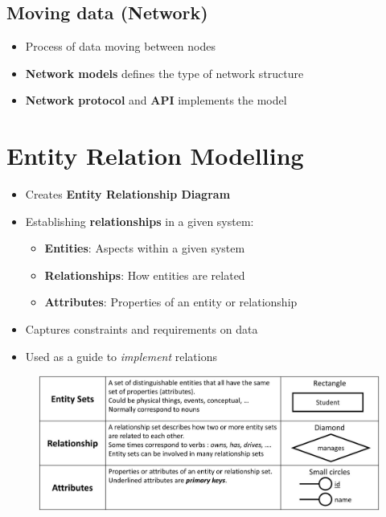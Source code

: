 \documentclass[conference]{IEEEtran}
\begin{document}
\subsection{Moving data (Network)}

\begin{itemize}
    \item Process of data moving between nodes
    \item \textbf{Network models} defines the type of network structure
    \item \textbf{Network protocol} and \textbf{API} implements the model
\end{itemize}

\section{\textbf{Entity Relation Modelling}}
\begin{itemize}
    \item Creates \textbf{Entity Relationship Diagram}
    \item Establishing \textbf{relationships} in a given system:
    \begin{itemize}
        \item \textbf{Entities}: Aspects within a given system
        \item \textbf{Relationships}: How entities are related
        \item \textbf{Attributes}: Properties of an entity or relationship
    \end{itemize}
    \item Captures constraints and requirements on data 
    \item Used as a guide to \textit{implement} relations
\end{itemize}
\begin{figure} [h!]
    \centering
    \includegraphics[scale=0.3]{ERM.JPG}
\end{figure}
\end{document}
